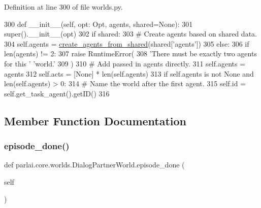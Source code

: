 Definition at line 300 of file worlds.\+py.


\begin{DoxyCode}
300     \textcolor{keyword}{def }\_\_init\_\_(self, opt: Opt, agents, shared=\textcolor{keywordtype}{None}):
301         super().\_\_init\_\_(opt)
302         \textcolor{keywordflow}{if} shared:
303             \textcolor{comment}{# Create agents based on shared data.}
304             self.agents = \hyperlink{namespaceparlai_1_1core_1_1agents_a5600530545f5e60a79e2d657b5af1d8c}{create\_agents\_from\_shared}(shared[\textcolor{stringliteral}{'agents'}])
305         \textcolor{keywordflow}{else}:
306             \textcolor{keywordflow}{if} len(agents) != 2:
307                 \textcolor{keywordflow}{raise} RuntimeError(
308                     \textcolor{stringliteral}{'There must be exactly two agents for this '} \textcolor{stringliteral}{'world.'}
309                 )
310             \textcolor{comment}{# Add passed in agents directly.}
311             self.agents = agents
312         self.acts = [\textcolor{keywordtype}{None}] * len(self.agents)
313         \textcolor{keywordflow}{if} self.agents \textcolor{keywordflow}{is} \textcolor{keywordflow}{not} \textcolor{keywordtype}{None} \textcolor{keywordflow}{and} len(self.agents) > 0:
314             \textcolor{comment}{# Name the world after the first agent.}
315             self.id = self.get\_task\_agent().getID()
316 
\end{DoxyCode}


\subsection{Member Function Documentation}
\mbox{\label{classparlai_1_1core_1_1worlds_1_1DialogPartnerWorld_a2d18d6d327510401b39e4549540e4ada}} 
\subsubsection{\texorpdfstring{episode\+\_\+done()}{episode\_done()}}
{\footnotesize\ttfamily def parlai.\+core.\+worlds.\+Dialog\+Partner\+World.\+episode\+\_\+done (\begin{DoxyParamCaption}\item[{}]{self }\end{DoxyParamCaption})}

